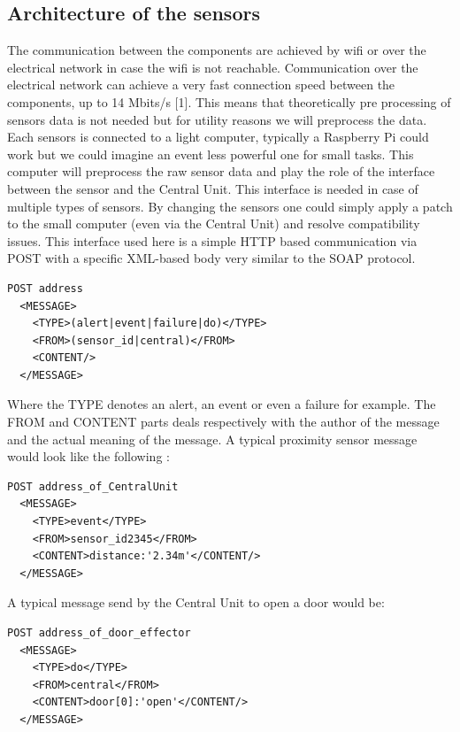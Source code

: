 \documentclass{acm_proc_article-sp}
\begin{document}
\subsection{Architecture of the sensors}
The communication between the components are achieved by wifi or over the electrical network in case the wifi is not reachable. 
Communication over the electrical network can achieve a very fast connection speed between the components, up to 14 Mbits/s [1]. 
This means that theoretically pre processing of sensors data is not needed but for utility reasons we will preprocess the data.
Each sensors is connected to a light computer, typically a Raspberry Pi could work but we could imagine an event less powerful one for small tasks. 
This computer will preprocess the raw sensor data and play the role of the interface between the sensor and the Central Unit. 
This interface is needed in case of multiple types of sensors. By changing the sensors one could simply apply a patch to the small computer (even via the Central Unit) and resolve compatibility issues. 
This interface used here is a simple HTTP based communication via POST with a  specific XML-based body very similar to the SOAP protocol.
\begin{verbatim}
POST address 
  <MESSAGE>
    <TYPE>(alert|event|failure|do)</TYPE>
    <FROM>(sensor_id|central)</FROM>
    <CONTENT/>
  </MESSAGE>
\end{verbatim}
Where the TYPE denotes an alert, an event or even a failure for example. 
The FROM and CONTENT parts deals respectively with the author of the message and the actual meaning of the message. 
A typical proximity sensor message would look like the following :
\begin{verbatim}
POST address_of_CentralUnit 
  <MESSAGE>
    <TYPE>event</TYPE>
    <FROM>sensor_id2345</FROM>
    <CONTENT>distance:'2.34m'</CONTENT/>
  </MESSAGE>
\end{verbatim}
A typical message send by the Central Unit to open a door would be:
\begin{verbatim}
POST address_of_door_effector
  <MESSAGE>
    <TYPE>do</TYPE>
    <FROM>central</FROM>
    <CONTENT>door[0]:'open'</CONTENT/>
  </MESSAGE> 
\end{verbatim}
\end{document}
